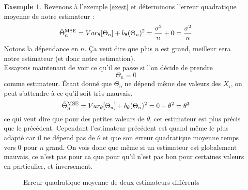 \documentclass[a4paper,12pt]{report}
\theoremstyle{definition}
\newcommand{\x}{\times}
\renewcommand{\(}{\left(}
\renewcommand{\)}{\right)}
\renewcommand{\t}{\text}
\newtheorem{exmp}[thm]{Exemple}
\begin{document}
        \begin{exmp}
            Revenons à l'exemple \ref{exest} et déterminons l'erreur quadratique moyenne de notre estimateur :
            $$\Tilde{\Theta}_n^{\t{MSE}} = Var_\theta[\Theta_n]+b_\theta(\Theta_n)^2 = \frac{\sigma^2}{n}+0 = \frac{\sigma^2}{n}$$
            Notons la dépendance en $n$. Ça veut dire que plus $n$ est grand, meilleur sera notre estimateur (et donc notre estimation).\\
            Essayons maintenant de voir ce qu'il se passe si l'on décide de prendre
            $$\Theta_n = 0$$
            comme estimateur. Étant donné que $\Theta_n$ ne dépend même des valeurs des $X_i$, on peut s'attendre à ce qu'il soit très mauvais.
            $$\Tilde{\Theta}_n^{\t{MSE}} = Var_\theta[\Theta_n]+b_\theta(\Theta_n)^2 =0+\theta^2 = \theta^2$$
            ce qui veut dire que pour des petites valeurs de $\theta$, cet estimateur est plus précis que le précédent. Cependant l'estimateur précédent est quand même le plus adapté car il ne dépend pas de $\theta$ et que son erreur quadratique moyenne temps vers 0 pour $n$ grand. On vois donc que même si un estimateur est globalement mauvais, ce n'est pas pour ca que pour qu'il n'est pas bon pour certaines valeurs en particulier, et inversement.
            
            \begin{figure}[H]
                \centering
                \caption{Erreur quadratique moyenne de deux estimateurs différents}
            \end{figure}
        \end{exmp}
        
\end{document}

